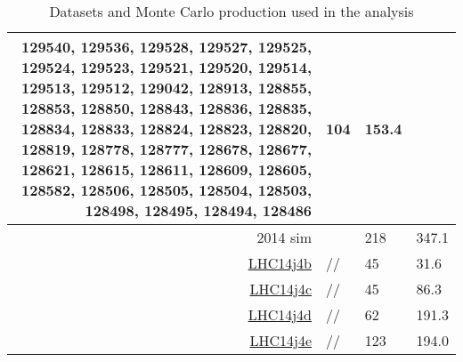 \begin{table}[h]
\begin{tabularx}{\textwidth}{r|Xll}
                                129540, 129536, 129528, 129527, 129525, 129524, 129523, 129521, 129520, 129514,
                                129513, 129512, 129042, 128913, 128855, 128853, 128850, 128843, 128836, 128835,
                                128834, 128833, 128824, 128823, 128820, 128819, 128778, 128777, 128678, 128677,
                                128621, 128615, 128611, 128609, 128605, 128582, 128506, 128505, 128504, 128503,
                                128498, 128495, 128494, 128486				&104				&153.4								\\
\hline
\hline
2014	 sim		&				&218				&347.1							\\
\hline
\href{https://alimonitor.cern.ch/job_details.jsp}{LHC14j4b}		&//				&45				&31.6								\\
\href{https://alimonitor.cern.ch/job_details.jsp}{LHC14j4c}		&//				&45				&86.3								\\
\href{https://alimonitor.cern.ch/job_details.jsp}{LHC14j4d}		&//				&62				&191.3								\\
\href{https://alimonitor.cern.ch/job_details.jsp}{LHC14j4e}		&//				&123				&194.0								\\
\hline
\end{tabularx}
\caption{Datasets and Monte Carlo production used in the analysis}
\label{tab:datasetsummary}
\end{table}